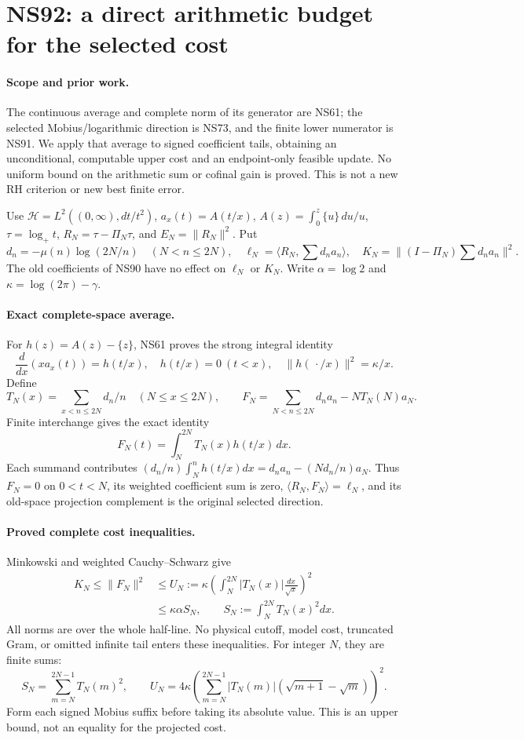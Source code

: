 \section*{NS92: a direct arithmetic budget for the selected cost}

\paragraph{Scope and prior work.}
The continuous average and complete norm of its generator are NS61; the
selected Mobius/logarithmic direction is NS73, and the finite lower
numerator is NS91. We apply that average to signed coefficient tails,
obtaining an unconditional, computable upper cost and an endpoint-only
feasible update. No uniform bound on the arithmetic sum or cofinal gain
is proved. This is not a new RH criterion or new best finite error.

Use $\mathcal H=L^2((0,\infty),dt/t^2)$, $a_x(t)=A(t/x)$,
$A(z)=\int_0^z\{u\}\,du/u$, $\tau=\log_+t$, $R_N=\tau-\Pi_N\tau$,
and $E_N=\|R_N\|^2$. Put
\[
 d_n=-\mu(n)\log(2N/n)\quad(N<n\le2N),\quad
 \ell_N=\langle R_N,\sum d_na_n\rangle,\quad
 K_N=\|(I-\Pi_N)\sum d_na_n\|^2.
\]
The old coefficients of NS90 have no effect on $\ell_N$ or $K_N$.
Write $\alpha=\log2$ and $\kappa=\log(2\pi)-\gamma$.

\paragraph{Exact complete-space average.}
For $h(z)=A(z)-\{z\}$, NS61 proves the strong integral identity
\[
 \frac{d}{dx}(xa_x(t))=h(t/x),\quad
 h(t/x)=0\ (t<x),\quad \|h(\,\cdot/x)\|^2=\kappa/x.
\]
Define
\[
 T_N(x)=\sum_{x<n\le2N}d_n/n\quad(N\le x\le2N),\qquad
 F_N=\sum_{N<n\le2N}d_na_n-NT_N(N)a_N.
\]
Finite interchange gives the exact identity
\begin{equation}\label{ns92-average}
 F_N(t)=\int_N^{2N}T_N(x)h(t/x)\,dx.
\end{equation}
Each summand contributes $(d_n/n)\int_N^n h(t/x)dx
=d_na_n-(Nd_n/n)a_N$. Thus $F_N=0$ on $0<t<N$, its weighted
coefficient sum is zero, $\langle R_N,F_N\rangle=\ell_N$, and its
old-space projection complement is the original selected direction.

\paragraph{Proved complete cost inequalities.}
Minkowski and weighted Cauchy--Schwarz give
\begin{align}
 K_N\le\|F_N\|^2
 &\le U_N:=\kappa\left(\int_N^{2N}|T_N(x)|\frac{dx}{\sqrt x}\right)^2
 \label{ns92-cost}\\
 &\le\kappa\alpha S_N,\qquad S_N:=\int_N^{2N}T_N(x)^2dx.
 \label{ns92-square}
\end{align}
All norms are over the whole half-line. No physical cutoff, model cost,
truncated Gram, or omitted infinite tail enters these inequalities.
For integer $N$, they are finite sums:
\[
 S_N=\sum_{m=N}^{2N-1}T_N(m)^2,\qquad
 U_N=4\kappa\left(\sum_{m=N}^{2N-1}|T_N(m)|
                    (\sqrt{m+1}-\sqrt m)\right)^2.
\]
Form each signed Mobius suffix before taking its absolute value.
This is an upper bound, not an equality for the projected cost.

